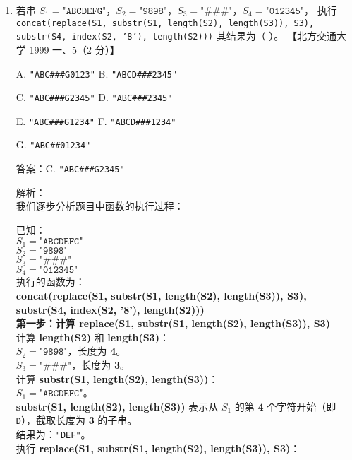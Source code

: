\documentclass[lang=cn,newtx,10pt,scheme=chinese]{../../../elegantbook}
\begin{document}
\begin{enumerate}
    \item 若串 $S_1 = \texttt{"ABCDEFG"}$，$S_2 = \texttt{"9898"}$，$S_3 = \texttt{"\#\#\#"}$，$S_4 = \texttt{"012345"}$，
    执行  
    \texttt{concat(replace(S1, substr(S1, length(S2), length(S3)), S3), substr(S4, index(S2, '8'), length(S2)))}  
    其结果为（ ）。  
    【北方交通大学 1999 一、5（2 分）】  

    A. \texttt{"ABC\#\#\#{G0123}"} \quad B. \texttt{"ABCD\#\#\#{2345}"}  

    C. \texttt{"ABC\#\#\#{G2345}"} \quad D. \texttt{"ABC\#\#\#{2345}"}  

    E. \texttt{"ABC\#\#\#{G1234}"} \quad F. \texttt{"ABCD\#\#\#{1234}"}  

    G. \texttt{"ABC\#\#{01234}"}

    答案：C. \texttt{"ABC\#\#\#{G2345}"}

    解析：\\
    我们逐步分析题目中函数的执行过程：

    已知：\\
    $S_1 = \texttt{"ABCDEFG"}$\\
    $S_2 = \texttt{"9898"}$\\
    $S_3 = \texttt{"\#\#\#"}$\\
    $S_4 = \texttt{"012345"}$\\
    执行的函数为：\\
    \textbf{concat(replace(S1, substr(S1, length(S2), length(S3)), S3), substr(S4, index(S2, '8'), length(S2)))}\\

    \textbf{第一步：计算 replace(S1, substr(S1, length(S2), length(S3)), S3)}\\
    计算 \textbf{length(S2)} 和 \textbf{length(S3)}：\\

    $S_2 = \texttt{"9898"}$，长度为 \textbf{4}。\\
    $S_3 = \texttt{"\#\#\#"}$，长度为 \textbf{3}。\\
    计算 \textbf{substr(S1, length(S2), length(S3))}：\\

    $S_1 = \texttt{"ABCDEFG"}$。\\
    \textbf{substr(S1, length(S2), length(S3))} 表示从 $S_1$ 的第 \textbf{4} 个字符开始（即 \texttt{D}），截取长度为 \textbf{3} 的子串。\\
    结果为：\texttt{"DEF"}。\\
    执行 \textbf{replace(S1, substr(S1, length(S2), length(S3)), S3)}：\\


\end{enumerate}
\end{document}
